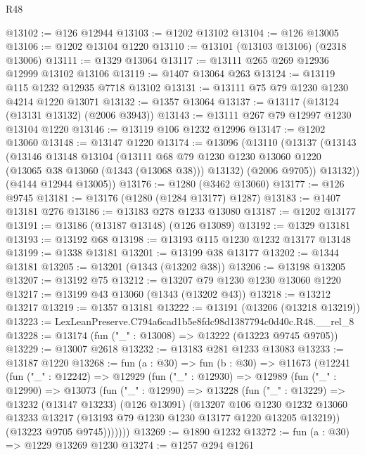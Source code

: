 \begin{lexlean}{R48}
\begin{coremodule}
@13102 := @126 @12944
@13103 := @1202 @13102
@13104 := @126 @13005
@13106 := @1202 @13104 @1220
@13110 := @13101 (@13103 @13106) (@2318 @13006)
@13111 := @1329 @13064
@13117 := @13111 @265 @269 @12936 @12999 @13102 @13106
@13119 := @1407 @13064 @263
@13124 := @13119 @115 @1232 @12935 @7718 @13102
@13131 := @13111 @75 @79 @1230 @1230 @4214 @1220 @13071
@13132 := @1357 @13064
@13137 := @13117 (@13124 (@13131 @13132) (@2006 @3943))
@13143 := @13111 @267 @79 @12997 @1230 @13104 @1220
@13146 := @13119 @106 @1232 @12996
@13147 := @1202 @13060
@13148 := @13147 @1220
@13174 := @13096
    (@13110
      (@13137
        (@13143
          (@13146
            @13148
            @13104
            (@13111
              @68
              @79
              @1230
              @1230
              @13060
              @1220
              (@13065 @38 @13060 (@1343 (@13068 @38)))
              @13132)
            (@2006 @9705))
          @13132))
      (@4144 @12944 @13005))
@13176 := @1280 (@3462 @13060)
@13177 := @126 @9745
@13181 := @13176 (@1280 (@1284 @13177) @1287)
@13183 := @1407 @13181 @276
@13186 := @13183 @278 @1233 @13080
@13187 := @1202 @13177
@13191 := @13186 (@13187 @13148) (@126 @13089)
@13192 := @1329 @13181
@13193 := @13192 @68
@13198 := @13193 @115 @1230 @1232 @13177 @13148
@13199 := @1338 @13181
@13201 := @13199 @38 @13177
@13202 := @1344 @13181
@13205 := @13201 (@1343 (@13202 @38))
@13206 := @13198 @13205
@13207 := @13192 @75
@13212 := @13207 @79 @1230 @1230 @13060 @1220
@13217 := @13199 @43 @13060 (@1343 (@13202 @43))
@13218 := @13212 @13217
@13219 := @1357 @13181
@13222 := @13191 (@13206 (@13218 @13219))
@13223 := LexLeanPreserve.C794a6cad1b5e8fdc98d1387794c0d40c.R48.__rel_8
@13228 := @13174 (fun ("_" : @13008) => @13222 (@13223 @9745 @9705))
@13229 := @13007 @2618
@13232 := @13183 @281 @1233 @13083
@13233 := @13187 @1220
@13268 := fun (a : @30) =>
  fun (b : @30) =>
  @11673
    (@12241
      (fun ("_" : @12242) =>
      @12929
        (fun ("_" : @12930) =>
        @12989
          (fun ("_" : @12990) =>
          @13073
            (fun ("_" : @12990) =>
            @13228
              (fun ("_" : @13229) =>
              @13232
                (@13147 @13233)
                (@126 @13091)
                (@13207
                  @106
                  @1230
                  @1232
                  @13060
                  @13233
                  @13217
                  (@13193 @79 @1230 @1230 @13177 @1220 @13205 @13219))
                (@13223 @9705 @9745)))))))
@13269 := @1890 @1232
@13272 := fun (a : @30) => @1229 @13269 @1230
@13274 := @1257 @294 @1261

\end{coremodule}
\end{lexlean}
